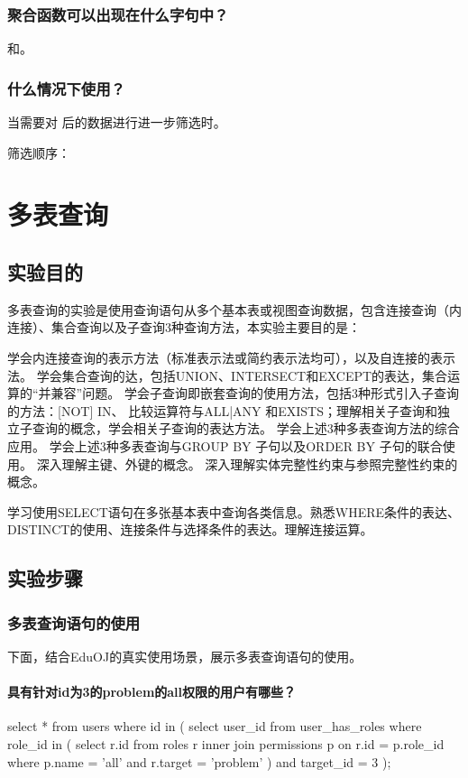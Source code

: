 \documentclass{ctexrep}
\begin{document}
\subsection*{聚合函数可以出现在什么字句中？}
和。
\subsection*{什么情况下使用？}
当需要对  后的数据进行进一步筛选时。

筛选顺序： 


\chapter*{多表查询}
\setcounter{section}{0}
\section{实验目的}

多表查询的实验是使用查询语句从多个基本表或视图查询数据，包含连接查询（内连接）、集合查询以及子查询3种查询方法，本实验主要目的是：
\begin{outline}[enumerate]
    \1 学会内连接查询的表示方法（标准表示法或简约表示法均可），以及自连接的表示法。
    \1 学会集合查询的达，包括UNION、INTERSECT和EXCEPT的表达，集合运算的“并兼容”问题。
    \1 学会子查询即嵌套查询的使用方法，包括3种形式引入子查询的方法：[NOT] IN、 比较运算符与ALL|ANY 和EXISTS；理解相关子查询和独立子查询的概念，学会相关子查询的表达方法。
    \1 学会上述3种多表查询方法的综合应用。
    \1 学会上述3种多表查询与GROUP BY 子句以及ORDER BY 子句的联合使用。
    \1 深入理解主键、外键的概念。
    \1 深入理解实体完整性约束与参照完整性约束的概念。
\end{outline}
学习使用SELECT语句在多张基本表中查询各类信息。熟悉WHERE条件的表达、DISTINCT的使用、连接条件与选择条件的表达。理解连接运算。


\section{实验步骤}
\subsection{多表查询语句的使用}
下面，结合EduOJ的真实使用场景，展示多表查询语句的使用。
\subsubsection*{具有针对id为3的problem的all权限的用户有哪些？}
\begin{run}
    select * from users where id in (
        select user_id from user_has_roles where role_id in (
            select r.id from roles r 
            inner join permissions p on r.id = p.role_id 
            where p.name = 'all' and r.target = 'problem'
        ) and target_id = 3
    );
\end{run}
\end{document}

